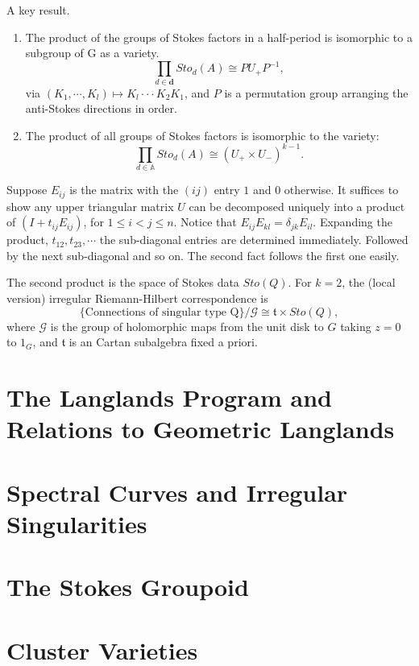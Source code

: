 \documentclass[oneside,english]{amsbook}
\numberwithin{section}{chapter}
\numberwithin{equation}{section}
\numberwithin{figure}{section}
\theoremstyle{plain}
\theoremstyle{definition}
\theoremstyle{remark}
\theoremstyle{definition}
\theoremstyle{definition}
\theoremstyle{plain}
\begin{document}
A key result.
\begin{enumerate}
  \item The product of the groups of Stokes factors in a half-period is isomorphic to a subgroup of G as a variety.
    $$\prod_{d\in \textbf{d}}Sto_d(A) \cong PU_+P^{-1},$$
    via $(K_1,\dotsb,K_l)\mapsto K_l \cdot \cdot \cdot K_2K_1$, and $P$ is a permutation group arranging the anti-Stokes directions in order.
  \item The product of all groups of Stokes factors is isomorphic to the variety:
    $$\prod_{d\in \mathbb{A}}Sto_d(A) \cong (U_+\times U_-)^{k-1}.$$
\end{enumerate}

Suppose $E_{ij}$ is the matrix with the $(ij)$ entry $1$ and $0$ otherwise. It suffices to show any upper triangular matrix $U$ can be decomposed uniquely into a product of $(I+t_{ij}E_{ij})$, for $1\leq i < j\leq n$. Notice that $E_{ij}E_{kl} = \delta_{jk}E_{il}$. Expanding the product, $t_{12}, t_{23},\dotsb$ the sub-diagonal entries are determined immediately. Followed by the next sub-diagonal and so on. The second fact follows the first one easily.

The second product is the space of Stokes data $Sto(Q)$. For $k=2$, the (local version) irregular Riemann-Hilbert correspondence is
$$\{\text{Connections of singular type Q}\}/\mathcal {G} \cong \mathfrak{t} \times Sto(Q),$$
where $\mathcal {G}$ is the group of holomorphic maps from the unit disk to $G$ taking $z=0$ to $1_G$, and $\mathfrak{t}$ is an Cartan subalgebra fixed a priori.


\chapter{The Langlands Program and Relations to Geometric Langlands}


\chapter{Spectral Curves and Irregular Singularities}


\chapter{The Stokes Groupoid}


\chapter{Cluster Varieties}
\end{document}
